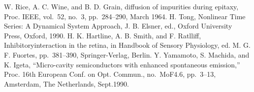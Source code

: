 \documentclass[MIRU,submit]{miru2019j}
\begin{document}
%
%

\begin{thebibliography}{9}%
W. Rice, A. C. Wine, and B. D. Grain,
diffusion of impurities during epitaxy,
Proc. IEEE, vol.~52, no.~3, pp.~284--290, March 1964.
 H. Tong, Nonlinear Time Series: A Dynamical System Approach, J. B. Elsner, ed., Oxford University Press, Oxford, 1990.
H. K. Hartline, A. B. Smith, and F. Ratlliff,
Inhibitoryinteraction in the retina,
in Handbook of Sensory Physiology,
ed. M. G. F. Fuortes, pp.~381--390, Springer-Verlag, Berlin.
Y. Yamamoto, S. Machida, and K. Igeta,
``Micro-cavity semiconductors with enhanced spontaneous emission,''
Proc. 16th European Conf. on Opt. Commun.,
no.~MoF4.6, pp.~3--13, Amsterdam, The Netherlands, Sept.1990.
\end{thebibliography}
\end{document}
